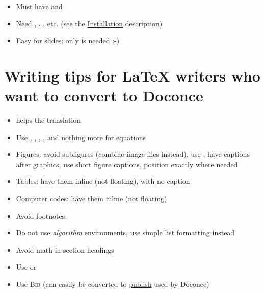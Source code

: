 \documentclass[%
twoside,                 %
draft,                   %
final,                   %
chapterprefix=true,      %
open=right               %
10pt]{book}
\newcounter{doconce:movie:counter}
\newcounter{doconce:exercise:counter}
\begin{document}
\begin{shadedquoteBlue}
\begin{itemize}
\begin{itemize}
   \item Must have  and 

   \item Need , , , etc. (see the \href{{http://hplgit.github.io/doconce/doc/pub/manual/html/manual.html#installation-of-doconce-and-its-dependencies}}{Installation} description)

   \item Easy for slides: only  is needed :-)
\end{itemize}

\noindent
\end{itemize}

\noindent
\section*{Writing tips for {\LaTeX} writers who want to convert to Doconce}

\begin{itemize}
 \item {} helps the translation

 \item Use \code{\[ \]}, , , ,  and nothing more for
   equations

 \item Figures: avoid subfigures (combine image files instead), use , have captions after graphics, use short figure captions, position exactly where needed

 \item Tables: have them inline (not floating), with no caption

 \item Computer codes: have them inline (not floating)

 \item Avoid footnotes, 

 \item Do not use \emph{algorithm} environments, use simple list formatting instead

 \item Avoid math in section headings

 \item Use  or 

 \item Use \textsc{Bib}\negthinspace{\TeX} (can easily be converted to \href{{https://bitbucket.org/logg/publish}}{publish} used by Doconce)


\end{itemize}
\end{shadedquoteBlue}
\end{document}
